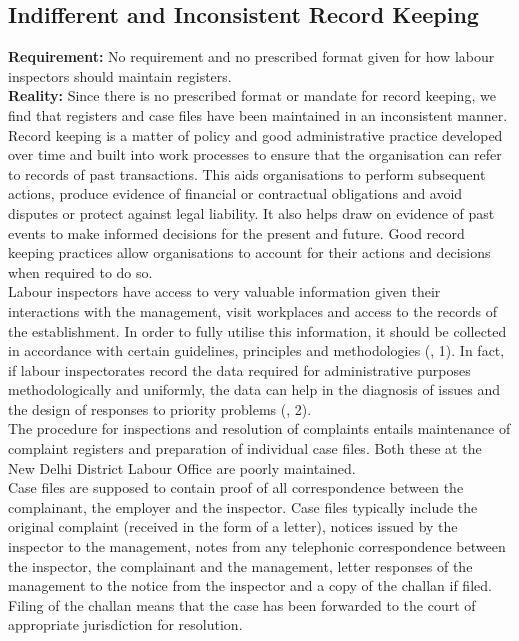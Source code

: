 \documentclass[a4paper, 12pt, twoside]{article}
\begin{document}
\subsection{Indifferent and Inconsistent Record Keeping}

\textbf{Requirement:} No requirement and no prescribed format given for how labour inspectors should maintain registers.\\

\textbf{Reality:}  Since there is no prescribed format or mandate for record keeping, we find that registers and case files have been maintained in an inconsistent manner. \\

Record keeping is a matter of policy and good administrative practice developed over time and built into work processes to ensure that the organisation can refer to records of past transactions. This aids organisations to perform subsequent actions, produce evidence of financial or contractual obligations and avoid disputes or protect against legal liability. It also helps draw on evidence of past events to make informed decisions for the present and future. Good record keeping practices allow organisations to account for their actions and decisions when required to do so. \\

Labour inspectors have access to very valuable information given their interactions with the management, visit workplaces and access to the records of the establishment. In order to fully utilise this information, it should be collected in accordance with certain guidelines, principles and methodologies (\cite{iloreportstatistics}, 1). In fact, if labour inspectorates record the data required for administrative purposes methodologically and uniformly, the data can help in the diagnosis of issues and the design of responses to priority problems (\cite{iloreportstatistics}, 2). \\

The procedure for inspections and resolution of complaints entails maintenance of complaint registers and preparation of individual case files. Both these at the New Delhi District Labour Office are poorly maintained. \\

Case files are supposed to contain proof of all correspondence between the complainant, the employer and the inspector. Case files typically include the original complaint (received in the form of a letter), notices issued by the inspector to the management, notes from any telephonic correspondence between the inspector, the complainant and the management, letter responses of the management to the notice from the inspector and a copy of the challan if filed. Filing of the challan means that the case has been forwarded to the court of appropriate jurisdiction for resolution. \\
\end{document}
